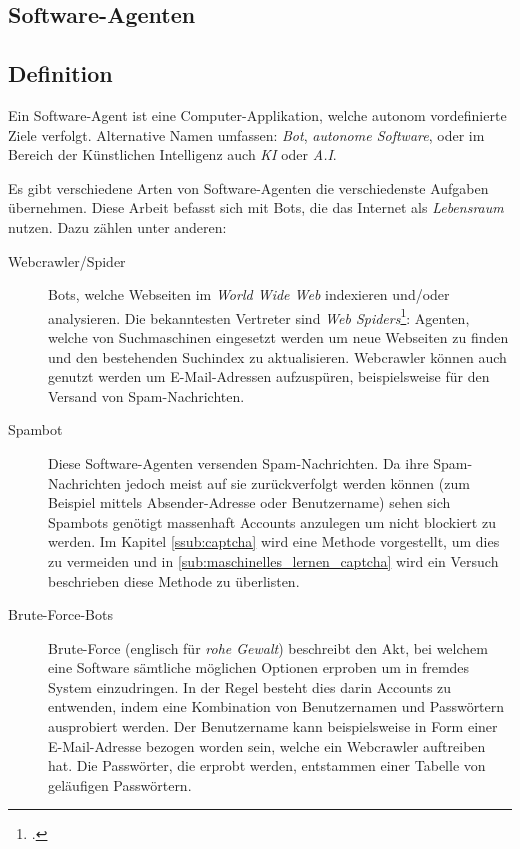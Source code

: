 \subsection{Software-Agenten} %
\label{sub:software_agenten}
\subsection{Definition} %
\label{sub:software-agent_definition}
Ein Software-Agent ist eine Computer-Applikation, welche autonom vordefinierte Ziele verfolgt.
Alternative Namen umfassen: \emph{Bot}, \emph{autonome Software}, oder im Bereich der Künstlichen Intelligenz auch \emph{KI} oder \emph{A.I}. 

Es gibt verschiedene Arten von Software-Agenten die verschiedenste Aufgaben übernehmen.
Diese Arbeit befasst sich mit Bots, die das Internet als \emph{Lebensraum} nutzen.
Dazu zählen unter anderen:

\begin{description}
  \item[Webcrawler/Spider]
  Bots, welche Webseiten im \emph{World Wide Web} indexieren und/oder analysieren.
  Die bekanntesten Vertreter sind \emph{Web Spiders}\footcite{tkWWWRobot}: Agenten, welche von Suchmaschinen eingesetzt werden um neue Webseiten zu finden und den bestehenden Suchindex zu aktualisieren.
  Webcrawler können auch genutzt werden um E-Mail-Adressen aufzuspüren, beispielsweise für den Versand von Spam-Nachrichten.
  
  \item[Spambot]
  Diese Software-Agenten versenden Spam-Nachrichten.
  Da ihre Spam-Nachrichten jedoch meist auf sie zurückverfolgt werden können (zum Beispiel mittels Absender-Adresse oder Benutzername) sehen sich Spambots genötigt massenhaft Accounts anzulegen um nicht blockiert zu werden.
  Im Kapitel \ref{ssub:captcha} wird eine Methode vorgestellt, um dies zu vermeiden und in \ref{sub:maschinelles_lernen_captcha} wird ein Versuch beschrieben diese Methode zu überlisten.
  
  \item[Brute-Force-Bots]
  Brute-Force (englisch für \emph{rohe Gewalt}) beschreibt den Akt, bei welchem eine Software sämtliche möglichen Optionen erproben um in fremdes System einzudringen.
  In der Regel besteht dies darin Accounts zu entwenden, indem eine Kombination von Benutzernamen und Passwörtern ausprobiert werden.
  Der Benutzername kann beispielsweise in Form einer E-Mail-Adresse bezogen worden sein, welche ein Webcrawler auftreiben hat.
  Die Passwörter, die erprobt werden, entstammen einer Tabelle von geläufigen Passwörtern.
\end{description}
